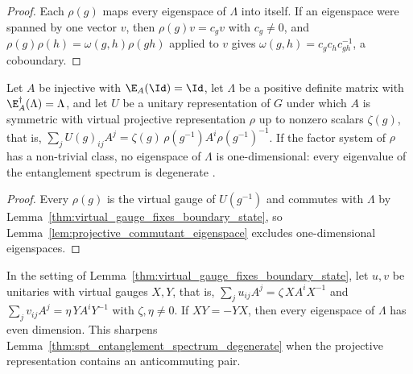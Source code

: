\begin{proof}\leanok
    Each $\rho(g)$ maps every eigenspace of $\Lambda$ into itself.  If an
    eigenspace were spanned by one vector $v$, then $\rho(g)v=c_gv$ with
    $c_g\neq0$, and $\rho(g)\rho(h)=\omega(g,h)\rho(gh)$ applied to $v$ gives
    $\omega(g,h)=c_gc_hc_{gh}^{-1}$, a coboundary.
\end{proof}

\begin{lemma}
    \label{thm:spt_entanglement_spectrum_degenerate}
    \leanok
    Let $A$ be injective with $\E_A(\Id)=\Id$, let $\Lambda$ be a positive
    definite matrix with $\E_A^\dagger(\Lambda)=\Lambda$, and let $U$ be a unitary
    representation of $G$ under which $A$ is symmetric with virtual projective
    representation $\rho$ up to nonzero scalars $\zeta(g)$, that is,
    $\sum_jU(g)_{ij}A^j=\zeta(g)\,\rho(g^{-1})A^i\rho(g^{-1})^{-1}$.  If the factor system of
    $\rho$ has a non-trivial class, no eigenspace of $\Lambda$ is one-dimensional:
    every eigenvalue of the entanglement spectrum is degenerate
    \cite[Section~III.A]{Cirac2021Matrix}.
\end{lemma}

\begin{proof}\leanok
    Every $\rho(g)$ is the virtual gauge of $U(g^{-1})$ and commutes with $\Lambda$
    by Lemma~\ref{thm:virtual_gauge_fixes_boundary_state}, so
    Lemma~\ref{lem:projective_commutant_eigenspace} excludes one-dimensional
    eigenspaces.
\end{proof}

\begin{lemma}
    \label{thm:spt_entanglement_spectrum_even}
    \leanok
    In the setting of Lemma~\ref{thm:virtual_gauge_fixes_boundary_state}, let
    $u,v$ be unitaries with virtual gauges $X,Y$, that is,
    $\sum_j u_{ij}A^j=\zeta\,XA^iX^{-1}$ and
    $\sum_j v_{ij}A^j=\eta\,YA^iY^{-1}$ with $\zeta,\eta\neq0$.  If $XY=-YX$,
    then every eigenspace of $\Lambda$ has even dimension.  This sharpens
    Lemma~\ref{thm:spt_entanglement_spectrum_degenerate} when the projective
    representation contains an anticommuting pair.
\end{lemma}

